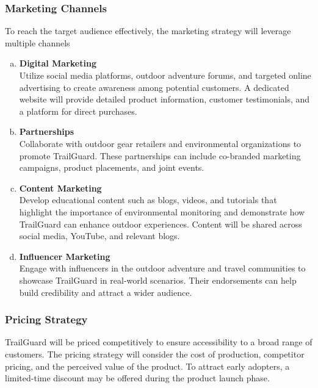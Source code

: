 \documentclass[a4paper,11pt]{article}%
\begin{document}
\subsubsection{Marketing Channels}
To reach the target audience effectively, the marketing strategy will leverage multiple channels

\begin{enumerate}[a)]
	\item \textbf{Digital Marketing}
	\\ Utilize social media platforms, outdoor adventure forums, and targeted online advertising to create awareness among potential customers. A dedicated website will provide detailed product information, customer testimonials, and a platform for direct purchases.
	\item \textbf{Partnerships}
	\\ Collaborate with outdoor gear retailers and environmental organizations to promote TrailGuard. These partnerships can include co-branded marketing campaigns, product placements, and joint events.
	\item \textbf{Content Marketing}
	\\  Develop educational content such as blogs, videos, and tutorials that highlight the importance of environmental monitoring and demonstrate how TrailGuard can enhance outdoor experiences. Content will be shared across social media, YouTube, and relevant blogs.
	\item \textbf{Influencer Marketing}
	\\  Engage with influencers in the outdoor adventure and travel communities to showcase TrailGuard in real-world scenarios. Their endorsements can help build credibility and attract a wider audience.
\end{enumerate}

\subsubsection{Pricing Strategy}
TrailGuard will be priced competitively to ensure accessibility to a broad range of customers. The pricing strategy will consider the cost of production, competitor pricing, and the perceived value of the product. To attract early adopters, a limited-time discount may be offered during the product launch phase.
\newpage
\end{document}
